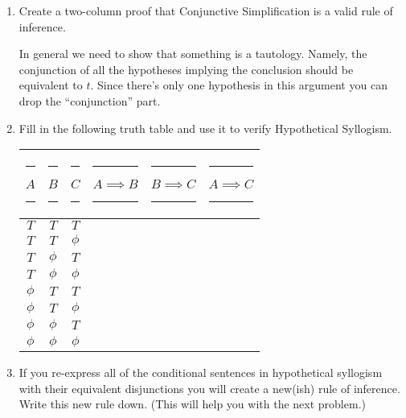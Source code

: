 \documentclass{amsart}
\begin{document}
\begin{enumerate}
\vfill

\newpage

\item Create a two-column proof that Conjunctive Simplification is a valid rule of inference.

In general we need to show that something is a tautology.  Namely, the conjunction of all the hypotheses implying the conclusion should be equivalent to $t$.  Since there's only one hypothesis in this argument you can drop the ``conjunction'' part.

\vfill

\newpage

\item Fill in the following truth table and use it to verify Hypothetical Syllogism.

\vspace{.2in}

\hspace{-.5in}
\begin{tabular}{c|c|c||c|c||c}
\rule[-6pt]{0pt}{24pt} \rule{8pt}{0pt} $A$ \rule{8pt}{0pt} & \rule{8pt}{0pt} $B$ \rule{8pt}{0pt} & \rule{8pt}{0pt} $C$ \rule{8pt}{0pt} & \rule{8pt}{0pt} $A \implies B$ \rule{8pt}{0pt} & \rule{8pt}{0pt} $B \implies C$ \rule{8pt}{0pt} & \rule{8pt}{0pt} $A \implies C$ \rule{8pt}{0pt} \\ \hline
\rule[-6pt]{0pt}{24pt} $T$    & $T$    & $T$    & & & \\
\rule[-6pt]{0pt}{24pt} $T$    & $T$    & $\phi$ & & & \\
\rule[-6pt]{0pt}{24pt} $T$    & $\phi$ & $T$    & & & \\
\rule[-6pt]{0pt}{24pt} $T$    & $\phi$ & $\phi$ & & & \\ \hline
\rule[-6pt]{0pt}{24pt} $\phi$ & $T$    & $T$    & & & \\
\rule[-6pt]{0pt}{24pt} $\phi$ & $T$    & $\phi$ & & & \\
\rule[-6pt]{0pt}{24pt} $\phi$ & $\phi$ & $T$    & & & \\
\rule[-6pt]{0pt}{24pt} $\phi$ & $\phi$ & $\phi$ & & & \\
\end{tabular}

\vspace{.5in}

\item If you re-express all of the conditional sentences in hypothetical syllogism with their equivalent disjunctions
you will create a new(ish) rule of inference.  Write this new rule down.  (This will help you with the next problem.)


\end{enumerate}
\end{document}
